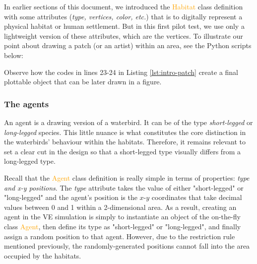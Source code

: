 In earlier sections of this document, we introduced the \textcolor{orange}{Habitat} class definition with some attributes (\emph{type, vertices, color, etc.}) that is to digitally represent a physical habitat or human settlement. But in this first pilot test, we use only a lightweight version of these attributes, which are the vertices. To illustrate our point about drawing a patch (or an artist) within an area, see the Python scripts below:



\noindent
Observe how the codes in lines 23-24 in Listing \ref{lst:intro-patch} create a final plottable object that can be later drawn in a figure.

\subsubsection{The agents}
An agent is a drawing version of a waterbird. It can be of the type \emph{short-legged} or \emph{long-legged} species. This little nuance is what constitutes the core distinction in the waterbirds' behaviour within the habitats. Therefore, it remains relevant to set a clear cut in the design so that a short-legged type visually differs from a long-legged type.

Recall that the \textcolor{orange}{Agent} class definition is really simple in terms of properties: \emph{type and x-y positions}. The \emph{type} attribute takes the value of either "short-legged" or "long-legged" and the agent's position is the $x$-$y$ coordinates that take decimal values between 0 and 1 within a 2-dimensional area. As a result, creating an agent in the VE simulation is simply to instantiate an object of the on-the-fly class \textcolor{orange}{Agent}, then define its type as "short-legged" or "long-legged", and finally assign a random position to that agent. However, due to the restriction rule mentioned previously, the randomly-generated positions cannot fall into the area occupied by the habitats.


